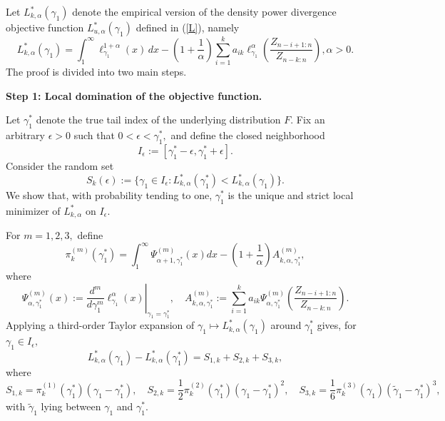 \documentclass[reqno,openbib,runningheads,a4paper,12pt]{amsart}%
\begin{document}
\noindent Let $L_{k,\alpha}^{\ast}(\gamma_{1})$ denote the empirical version
of the density power divergence objective function $L_{u,\alpha}^{\ast}%
(\gamma_{1})$ defined in (\ref{L}), namely
\[
L_{k,\alpha}^{\ast}(\gamma_{1})=\int_{1}^{\infty}\ell_{\gamma_{1}}^{1+\alpha
}(x)\,dx-\left(  1+\frac{1}{\alpha}\right)  \sum_{i=1}^{k}a_{ik}\ell
_{\gamma_{1}}^{\alpha}\left(  \frac{Z_{n-i+1:n}}{Z_{n-k:n}}\right)  ,\text{
}\alpha>0.
\]
The proof is divided into two main steps.\smallskip

\noindent\textbf{Step 1: Local domination of the objective function.}%
\smallskip

\noindent Let $\gamma_{1}^{\ast}$ denote the true tail index of the underlying
distribution $F.$ Fix an arbitrary $\epsilon>0$ such that $0<\epsilon
<\gamma_{1}^{\ast},$ and define the closed neighborhood
\[
I_{\epsilon}:=[\gamma_{1}^{\ast}-\epsilon,\gamma_{1}^{\ast}+\epsilon].
\]
Consider the random set
\[
S_{k}(\epsilon):=\{\gamma_{1}\in I_{\epsilon}:L_{k,\alpha}^{\ast}(\gamma
_{1}^{\ast})<L_{k,\alpha}^{\ast}(\gamma_{1})\}.
\]
We show that, with probability tending to one, $\gamma_{1}^{\ast}$ is the
unique and strict local minimizer of $L_{k,\alpha}^{\ast}$ on $I_{\epsilon}.$

\noindent For $m=1,2,3,$ define
\begin{equation}
\pi_{k}^{(m)}(\gamma_{1}^{\ast})=\int_{1}^{\infty}\Psi_{\alpha+1,\gamma
_{1}^{\ast}}^{(m)}(x)dx-\left(  1+\frac{1}{\alpha}\right)  A_{k,\alpha
,\gamma_{1}^{\ast}}^{(m)}, \label{pim}%
\end{equation}
where
\begin{equation}
\Psi_{\alpha,\gamma_{1}^{\ast}}^{(m)}(x):=\left.  \frac{d^{m}}{d\gamma_{1}%
^{m}}\ell_{\gamma_{1}}^{\alpha}(x)\right\vert _{\gamma_{1}=\gamma_{1}^{\ast}%
},\quad A_{k,\alpha,\gamma_{1}^{\ast}}^{(m)}:=\sum_{i=1}^{k}a_{ik}\Psi
_{\alpha,\gamma_{1}^{\ast}}^{(m)}\left(  \frac{Z_{n-i+1:n}}{Z_{n-k:n}}\right)
. \label{psim-Am}%
\end{equation}
Applying a third-order Taylor expansion of $\gamma_{1}\mapsto L_{k,\alpha
}^{\ast}(\gamma_{1})$ around $\gamma_{1}^{\ast}$ gives, for $\gamma_{1}\in
I_{\epsilon},$
\[
L_{k,\alpha}^{\ast}(\gamma_{1})-L_{k,\alpha}^{\ast}(\gamma_{1}^{\ast}%
)=S_{1,k}+S_{2,k}+S_{3,k},
\]
where
\[
S_{1,k}=\pi_{k}^{(1)}(\gamma_{1}^{\ast})(\gamma_{1}-\gamma_{1}^{\ast}),\quad
S_{2,k}=\frac{1}{2}\pi_{k}^{(2)}(\gamma_{1}^{\ast})(\gamma_{1}-\gamma
_{1}^{\ast})^{2},\quad S_{3,k}=\frac{1}{6}\pi_{k}^{(3)}(\gamma_{1}%
)(\widetilde{\gamma}_{1}-\gamma_{1}^{\ast})^{3},
\]
with $\widetilde{\gamma}_{1}$ lying between $\gamma_{1}$ and $\gamma_{1}%
^{\ast}.$\smallskip
\end{document}
